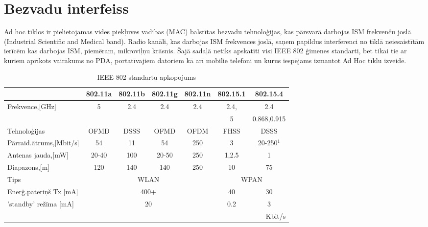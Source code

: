 \section{Bezvadu interfeiss}
Ad hoc tīklos ir pielietojamas vides piekļuves vadības (\acs{MAC}) balstītas bezvadu tehnoloģijas, kas pārsvarā darbojas ISM frekvenču joslā (Industrial Scientific and Medical band). Radio kanāli, kas darbojas ISM frekvences joslā, saņem papildus interferenci no tīklā neiesaistītām ierīcēm kas darbojas ISM, piemēram, mikroviļņu krāsnis. Šajā sadaļā netiks apskatīti visi IEEE 802 ģimenes standarti, bet tikai tie ar kuriem aprīkots vairākums no PDA, portatīvajiem datoriem kā arī mobilie telefoni un kurus iespējams izmantot Ad Hoc tīklu izveidē.

\begin{table}[!ht]
    \begin{tabular}{|l|c|c|c|c|c|c|}
        \hline
~              &802.11a&802.11b&802.11g&802.11n&802.15.1&802.15.4\\ \hline
Frekvence,[GHz]&5      &2.4    &2.4    &2.4    &2.4,     &2.4\\
              ~&      ~&      ~&      ~&     ~ &5        &0.868,0.915\\
Tehnoloģijas   &OFMD   &DSSS   &OFMD   &OFDM   &FHSS     &DSSS\\
Pārraid.ātrums,[Mbit/s]&54     &11     &54     &250      &3  &20-250$^{1}$\\
Antenas jauda,[mW]&20-40&100   &20-50  &250    &1,2.5&1\\
Diapazons,[m]  &120     &140   &140    &250    &10       &75\\
Tips           &\multicolumn{4}{c|}{WLAN}&\multicolumn{2}{c|}{WPAN}\\
 Enerģ.pateriņš Tx [mA]&\multicolumn{4}{c|}{400+}&40     &30\\
      'standby' režīma [mA]  &\multicolumn{4}{c|}{20}&0.2        &3\\\hline
\multicolumn{7}{r}{ \footnotemark[1]\footnotesize{Kbit/s}}
    \end{tabular}
\caption{IEEE 802 standartu apkopojums}
\end{table}

